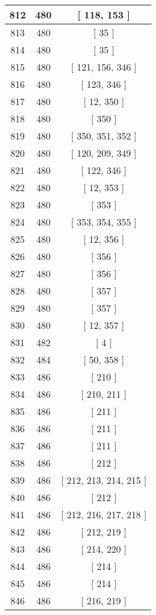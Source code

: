 \begin{center}
\begin{longtable}[H]{|| c c c ||}
812 & 480 & [ 118, 153 ] \\ 
\hline
813 & 480 & [ 35 ] \\ 
\hline
814 & 480 & [ 35 ] \\ 
\hline
815 & 480 & [ 121, 156, 346 ] \\ 
\hline
816 & 480 & [ 123, 346 ] \\ 
\hline
817 & 480 & [ 12, 350 ] \\ 
\hline
818 & 480 & [ 350 ] \\ 
\hline
819 & 480 & [ 350, 351, 352 ] \\ 
\hline
820 & 480 & [ 120, 209, 349 ] \\ 
\hline
821 & 480 & [ 122, 346 ] \\ 
\hline
822 & 480 & [ 12, 353 ] \\ 
\hline
823 & 480 & [ 353 ] \\ 
\hline
824 & 480 & [ 353, 354, 355 ] \\ 
\hline
825 & 480 & [ 12, 356 ] \\ 
\hline
826 & 480 & [ 356 ] \\ 
\hline
827 & 480 & [ 356 ] \\ 
\hline
828 & 480 & [ 357 ] \\ 
\hline
829 & 480 & [ 357 ] \\ 
\hline
830 & 480 & [ 12, 357 ] \\ 
\hline
831 & 482 & [ 4 ] \\ 
\hline
832 & 484 & [ 50, 358 ] \\ 
\hline
833 & 486 & [ 210 ] \\ 
\hline
834 & 486 & [ 210, 211 ] \\ 
\hline
835 & 486 & [ 211 ] \\ 
\hline
836 & 486 & [ 211 ] \\ 
\hline
837 & 486 & [ 211 ] \\ 
\hline
838 & 486 & [ 212 ] \\ 
\hline
839 & 486 & [ 212, 213, 214, 215 ] \\ 
\hline
840 & 486 & [ 212 ] \\ 
\hline
841 & 486 & [ 212, 216, 217, 218 ] \\ 
\hline
842 & 486 & [ 212, 219 ] \\ 
\hline
843 & 486 & [ 214, 220 ] \\ 
\hline
844 & 486 & [ 214 ] \\ 
\hline
845 & 486 & [ 214 ] \\ 
\hline
846 & 486 & [ 216, 219 ] \\ 
\hline

\end{longtable}
\end{center}
